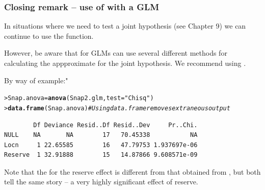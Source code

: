 \documentclass{beamer}\usepackage[]{graphicx}\usepackage[]{xcolor}
\makeatletter
\newcommand{\hlstr}[1]{\textcolor[rgb]{0.192,0.494,0.8}{#1}}%
\newcommand{\hlcom}[1]{\textcolor[rgb]{0.678,0.584,0.686}{\textit{#1}}}%
\newcommand{\hlstd}[1]{\textcolor[rgb]{0.345,0.345,0.345}{#1}}%
\newcommand{\hlkwb}[1]{\textcolor[rgb]{0.69,0.353,0.396}{#1}}%
\newcommand{\hlkwc}[1]{\textcolor[rgb]{0.333,0.667,0.333}{#1}}%
\newcommand{\hlkwd}[1]{\textcolor[rgb]{0.737,0.353,0.396}{\textbf{#1}}}%
\newenvironment{kframe}{%
 \def\at@end@of@kframe{}%
 \ifinner\ifhmode%
  \def\at@end@of@kframe{\end{minipage}}%
  \begin{minipage}{\columnwidth}%
 \fi\fi%
 \def\FrameCommand##1{\hskip\@totalleftmargin \hskip-\fboxsep
 \colorbox{shadecolor}{##1}\hskip-\fboxsep
     \hskip-\linewidth \hskip-\@totalleftmargin \hskip\columnwidth}%
 \MakeFramed {\advance\hsize-\width
   \@totalleftmargin\z@ \linewidth\hsize
   \@setminipage}}%
 {\par\unskip\endMakeFramed%
 \at@end@of@kframe}
\newenvironment{knitrout}{}{} %
\makeatother
\begin{document}
\begin{frame}[fragile]
\frametitle{Closing remark -- use of  with a GLM}
In situations where we need to test a joint hypothesis (see Chapter 9) we can continue to use the  function.
\medskip

However, be aware that  for GLMs can use several different methods for calculating the appproximate \pval{} for the joint hypothesis. We recommend using . 
\medskip

By way of example:"
\begin{knitrout}\scriptsize
{}\color{fgcolor}\begin{kframe}
\begin{alltt}
\hlstd{> }\hlstd{Snap.anova}\hlkwb{=}\hlkwd{anova}\hlstd{(Snap2.glm,}\hlkwc{test}\hlstd{=}\hlstr{"Chisq"}\hlstd{)}
\hlstd{> }\hlkwd{data.frame}\hlstd{(Snap.anova)} \hlcom{#Using data.frame removes extraneous output}
\end{alltt}
\begin{verbatim}
        Df Deviance Resid..Df Resid..Dev     Pr..Chi.
NULL    NA       NA        17   70.45338           NA
Locn     1 22.65585        16   47.79753 1.937697e-06
Reserve  1 32.91888        15   14.87866 9.608571e-09
\end{verbatim}
\end{kframe}
\end{knitrout}

Note that the \pval{} for the reserve effect is different from that obtained from , but both  tell the same story -- a very highly significant effect of reserve.
\end{frame}
\end{document}
